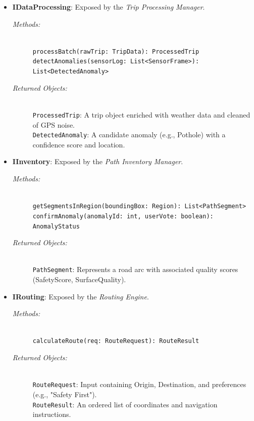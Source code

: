 \begin{itemize}
    \item \begin{minipage}[t]{\linewidth}
        \textbf{IDataProcessing}: Exposed by the \textit{Trip Processing Manager}.
        \begin{description}
            \item[\textit{Methods:}] \hfill \\
            \texttt{processBatch(rawTrip: TripData): ProcessedTrip} \\
            \texttt{detectAnomalies(sensorLog: List<SensorFrame>): List<DetectedAnomaly>}
            \item[\textit{Returned Objects:}] \hfill \\
            \texttt{ProcessedTrip}: A trip object enriched with weather data and cleaned of GPS noise. \\
            \texttt{DetectedAnomaly}: A candidate anomaly (e.g., Pothole) with a confidence score and location.
        \end{description}
    \end{minipage}
    \vspace{0.3cm}

    \item \begin{minipage}[t]{\linewidth}
        \textbf{IInventory}: Exposed by the \textit{Path Inventory Manager}.
        \begin{description}
            \item[\textit{Methods:}] \hfill \\
            \texttt{getSegmentsInRegion(boundingBox: Region): List<PathSegment>} \\
            \texttt{confirmAnomaly(anomalyId: int, userVote: boolean): AnomalyStatus}
            \item[\textit{Returned Objects:}] \hfill \\
            \texttt{PathSegment}: Represents a road arc with associated quality scores (SafetyScore, SurfaceQuality).
        \end{description}
    \end{minipage}
    \vspace{0.3cm}

    \item \begin{minipage}[t]{\linewidth}
        \textbf{IRouting}: Exposed by the \textit{Routing Engine}.
        \begin{description}
            \item[\textit{Methods:}] \hfill \\
            \texttt{calculateRoute(req: RouteRequest): RouteResult}
            \item[\textit{Returned Objects:}] \hfill \\
            \texttt{RouteRequest}: Input containing Origin, Destination, and preferences (e.g., "Safety First"). \\
            \texttt{RouteResult}: An ordered list of coordinates and navigation instructions.
        \end{description}
    \end{minipage}
\end{itemize}

